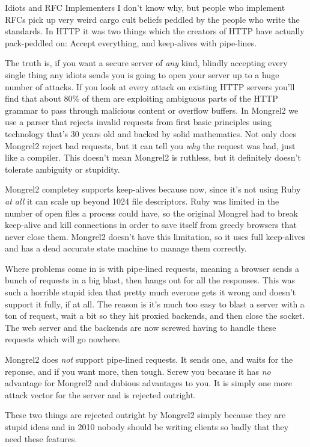 \begin{aside}{Idiots and RFC Implementers}
I don't know why, but people who implement RFCs pick up very weird cargo cult
beliefs peddled by the people who write the standards.  In HTTP it was two things
which the creators of HTTP have actually pack-peddled on:  Accept everything, and
keep-alives with pipe-lines.

The truth is, if you want a secure server of \emph{any} kind, blindly accepting every
single thing any idiots sends you is going to open your server up to a huge number
of attacks.  If you look at every attack on existing HTTP servers you'll find that
about 80\% of them are exploiting ambiguous parts of the HTTP grammar to pass
through malicious content or overflow buffers.  In Mongrel2 we use a parser that rejects
invalid requests from first basic principles using technology that's 30 years old and
backed by solid mathematics.  Not only does Mongrel2 reject bad requests, but it can
tell you \emph{why} the request was bad, just like a compiler.  This doesn't mean
Mongrel2 is ruthless, but it definitely doesn't tolerate ambiguity or stupidity.

Mongrel2 completey supports keep-alives because now, since it's not using Ruby
\emph{at all} it can scale up beyond 1024 file descriptors.  Ruby was limited
in the number of open files a process could have, so the original Mongrel had
to break keep-alive and kill connections in order to save itself from greedy
browsers that never close them.  Mongrel2 doesn't have this limitation, so it
uses full keep-alives and has a dead accurate state machine to manage them correctly.

Where problems come in is with pipe-lined requests, meaning a browser sends a bunch
of requests in a big blast, then hangs out for all the responses.  This was such a
horrible stupid idea that pretty much everone gets it wrong and doesn't support it
fully, if at all.  The reason is it's much too easy to blast a server with a ton
of request, wait a bit so they hit proxied backends, and then close the socket.  The
web server and the backends are now screwed having to handle these requests which will
go nowhere.

Mongrel2 does \emph{not} support pipe-lined requests.  It sends one, and waits for the
reponse, and if you want more, then tough.  Screw you because it has \emph{no} advantage
for Mongrel2 and dubious advantages to you.  It is simply one more attack vector for
the server and is rejected outright.

These two things are rejected outright by Mongrel2 simply because they are stupid ideas
and in 2010 nobody should be writing clients so badly that they need these features.
\end{aside}

